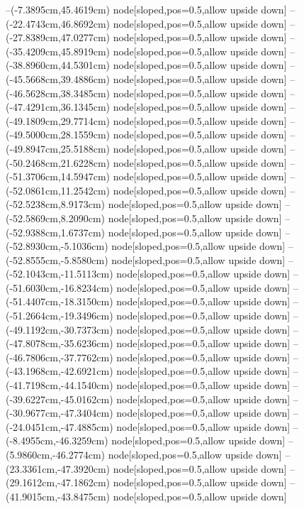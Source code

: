 --(-7.3895cm,45.4619cm) node[sloped,pos=0.5,allow upside down]{\ArrowIn}
--(-22.4743cm,46.8692cm) node[sloped,pos=0.5,allow upside down]{\ArrowIn}
--(-27.8389cm,47.0277cm) node[sloped,pos=0.5,allow upside down]{\ArrowIn}
--(-35.4209cm,45.8919cm) node[sloped,pos=0.5,allow upside down]{\ArrowIn}
--(-38.8960cm,44.5301cm) node[sloped,pos=0.5,allow upside down]{\ArrowIn}
--(-45.5668cm,39.4886cm) node[sloped,pos=0.5,allow upside down]{\ArrowIn}
--(-46.5628cm,38.3485cm) node[sloped,pos=0.5,allow upside down]{\ArrowIn}
--(-47.4291cm,36.1345cm) node[sloped,pos=0.5,allow upside down]{\ArrowIn}
--(-49.1809cm,29.7714cm) node[sloped,pos=0.5,allow upside down]{\ArrowIn}
--(-49.5000cm,28.1559cm) node[sloped,pos=0.5,allow upside down]{\ArrowIn}
--(-49.8947cm,25.5188cm) node[sloped,pos=0.5,allow upside down]{\ArrowIn}
--(-50.2468cm,21.6228cm) node[sloped,pos=0.5,allow upside down]{\ArrowIn}
--(-51.3706cm,14.5947cm) node[sloped,pos=0.5,allow upside down]{\ArrowIn}
--(-52.0861cm,11.2542cm) node[sloped,pos=0.5,allow upside down]{\ArrowIn}
--(-52.5238cm,8.9173cm) node[sloped,pos=0.5,allow upside down]{\ArrowIn}
--(-52.5869cm,8.2090cm) node[sloped,pos=0.5,allow upside down]{\arrowIn}
--(-52.9388cm,1.6737cm) node[sloped,pos=0.5,allow upside down]{\ArrowIn}
--(-52.8930cm,-5.1036cm) node[sloped,pos=0.5,allow upside down]{\ArrowIn}
--(-52.8555cm,-5.8580cm) node[sloped,pos=0.5,allow upside down]{\arrowIn}
--(-52.1043cm,-11.5113cm) node[sloped,pos=0.5,allow upside down]{\ArrowIn}
--(-51.6030cm,-16.8234cm) node[sloped,pos=0.5,allow upside down]{\ArrowIn}
--(-51.4407cm,-18.3150cm) node[sloped,pos=0.5,allow upside down]{\ArrowIn}
--(-51.2664cm,-19.3496cm) node[sloped,pos=0.5,allow upside down]{\ArrowIn}
--(-49.1192cm,-30.7373cm) node[sloped,pos=0.5,allow upside down]{\ArrowIn}
--(-47.8078cm,-35.6236cm) node[sloped,pos=0.5,allow upside down]{\ArrowIn}
--(-46.7806cm,-37.7762cm) node[sloped,pos=0.5,allow upside down]{\ArrowIn}
--(-43.1968cm,-42.6921cm) node[sloped,pos=0.5,allow upside down]{\ArrowIn}
--(-41.7198cm,-44.1540cm) node[sloped,pos=0.5,allow upside down]{\ArrowIn}
--(-39.6227cm,-45.0162cm) node[sloped,pos=0.5,allow upside down]{\ArrowIn}
--(-30.9677cm,-47.3404cm) node[sloped,pos=0.5,allow upside down]{\ArrowIn}
--(-24.0451cm,-47.4885cm) node[sloped,pos=0.5,allow upside down]{\ArrowIn}
--(-8.4955cm,-46.3259cm) node[sloped,pos=0.5,allow upside down]{\ArrowIn}
--(5.9860cm,-46.2774cm) node[sloped,pos=0.5,allow upside down]{\ArrowIn}
--(23.3361cm,-47.3920cm) node[sloped,pos=0.5,allow upside down]{\ArrowIn}
--(29.1612cm,-47.1862cm) node[sloped,pos=0.5,allow upside down]{\ArrowIn}
--(41.9015cm,-43.8475cm) node[sloped,pos=0.5,allow upside down]{\ArrowIn}
